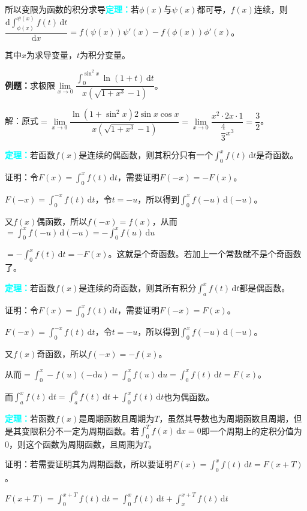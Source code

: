 \documentclass[UTF8, 12pt]{ctexart}
\begin{document}
所以变限为函数的积分求导\textcolor{aqua}{\textbf{定理：}}若$\phi(x)$与$\psi(x)$都可导，$f(x)$连续，则$\dfrac{\textrm{d}\int_{\phi(x)}^{\psi(x)}f(t)\,\textrm{d}t}{\textrm{d}x}=f(\psi(x))\psi'(x)-f(\phi(x))\phi'(x)$。

其中$x$为求导变量，$t$为积分变量。

\textbf{例题：}求极限$\lim\limits_{x\to 0}\dfrac{\int_0^{\sin^2x}\ln(1+t)\,\textrm{d}t}{x(\sqrt{1+x^3}-1)}$。

解：原式$=\lim\limits_{x\to 0}\dfrac{\ln(1+\sin^2x)2\sin x\cos x}{x(\sqrt{1+x^3}-1)}=\lim\limits_{x\to 0}\dfrac{x^2\cdot 2x\cdot 1}{\dfrac{4}{3}x^3}=\dfrac{3}{2}$。\smallskip

\textcolor{aqua}{\textbf{定理：}}若函数$f(x)$是连续的偶函数，则其积分只有一个$\int^x_0f(t)\,\textrm{d}t$是奇函数。

证明：令$F(x)=\int_0^xf(t)\,\textrm{d}t$，需要证明$F(-x)=-F(x)$。

$F(-x)=\int_0^{-x}f(t)\,\textrm{d}t$，令$t=-u$，所以得到$\int_0^xf(-u)\,\textrm{d}(-u)$。

又$f(x)$偶函数，所以$f(-x)=f(x)$，从而$=\int_0^xf(-u)\,\textrm{d}(-u)=-\int_0^xf(u)\,\textrm{d}u$

$=-\int_0^xf(t)\,\textrm{d}t=-F(x)$。这就是个奇函数。若加上一个常数就不是个奇函数了。

\textcolor{aqua}{\textbf{定理：}}若函数$f(x)$是连续的奇函数，则其所有积分$\int^x_af(t)\,\textrm{d}t$都是偶函数。

证明：令$F(x)=\int_0^xf(t)\,\textrm{d}t$，需要证明$F(-x)=F(x)$。

$F(-x)=\int_0^{-x}f(t)\,\textrm{d}t$，令$t=-u$，所以得到$\int_0^xf(-u)\,\textrm{d}(-u)$。

又$f(x)$奇函数，所以$f(-x)=-f(x)$。

从而$=\int_0^x-f(u)(-\textrm{d}u)=\int_0^xf(u)\,\textrm{d}u=\int_0^xf(t)\,\textrm{d}t=F(x)$。

而$\int_a^xf(t)\,\textrm{d}t=\int_a^0f(t)\,\textrm{d}t+\int_0^xf(t)\,\textrm{d}t$也为偶函数。

\textcolor{aqua}{\textbf{定理：}}若函数$f(x)$是周期函数且周期为$T$，虽然其导数也为周期函数且周期，但是其变限积分不一定为周期函数。若$\int_0^Tf(x)\,\textrm{d}x=0$即一个周期上的定积分值为0，则这个函数为周期函数，且周期为$T$。

证明：若需要证明其为周期函数，所以要证明$F(x)=\int_0^xf(t)\,\textrm{d}t=F(x+T)$。

$F(x+T)=\int_0^{x+T}f(t)\,\textrm{d}t=\int_0^xf(t)\,\textrm{d}t+\int_x^{x+T}f(t)\,\textrm{d}t$
\end{document}
